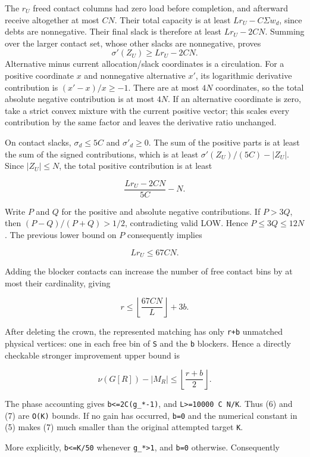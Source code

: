 The \(r_U\) freed contact columns had zero load before completion, and afterward receive altogether at most \(CN\). Their total capacity is at least \(Lr_U-CΣw_d\), since debts are nonnegative. Their final slack is therefore at least \(Lr_U-2CN\). Summing over the larger contact set, whose other slacks are nonnegative, proves \[
\sigma'(Z_U)\ge Lr_U-2CN.
\] Alternative minus current allocation/slack coordinates is a circulation. For a positive coordinate \(x\) and nonnegative alternative \(x′\), its logarithmic derivative contribution is \((x′-x)/x≥-1\). There are at most \(4N\) coordinates, so the total absolute negative contribution is at most \(4N\). If an alternative coordinate is zero, take a strict convex mixture with the current positive vector; this scales every contribution by the same factor and leaves the derivative ratio unchanged.

On contact slacks, \(σ_d≤5C\) and \(σ′_d≥0\). The sum of the positive parts is at least the sum of the signed contributions, which is at least \(σ′(Z_U)/(5C)-|Z_U|\). Since \(|Z_U|≤N\), the total positive contribution is at least

\[
\frac{Lr_U-2CN}{5C}-N.
\]

Write \(P\) and \(Q\) for the positive and absolute negative contributions. If \(P>3Q\), then \((P-Q)/(P+Q)>1/2\), contradicting valid LOW. Hence \(P≤3Q≤12N\). The previous lower bound on \(P\) consequently implies

\[
Lr_U\le67CN.\tag{5}
\]

Adding the blocker contacts can increase the number of free contact bins by at most their cardinality, giving

\[
r\le\left\lfloor\frac{67CN}{L}\right\rfloor+3b.\tag{6}
\]

After deleting the crown, the represented matching has only \texttt{r+b} unmatched physical vertices: one in each free bin of \texttt{S} and the \texttt{b} blockers. Hence a directly checkable stronger improvement upper bound is

\[
\nu(G[R])-|M_R|\le\left\lfloor\frac{r+b}{2}\right\rfloor.\tag{7}
\]

The phase accounting gives \texttt{b\textless{}=2C(g\_*-1)}, and \texttt{L\textgreater{}=10000\ C\ N/K}. Thus (6) and (7) are \texttt{O(K)} bounds. If no gain has occurred, \texttt{b=0} and the numerical constant in (5) makes (7) much smaller than the original attempted target \texttt{K}.

More explicitly, \texttt{b\textless{}=K/50} whenever \texttt{g\_*\textgreater{}1}, and \texttt{b=0} otherwise. Consequently

